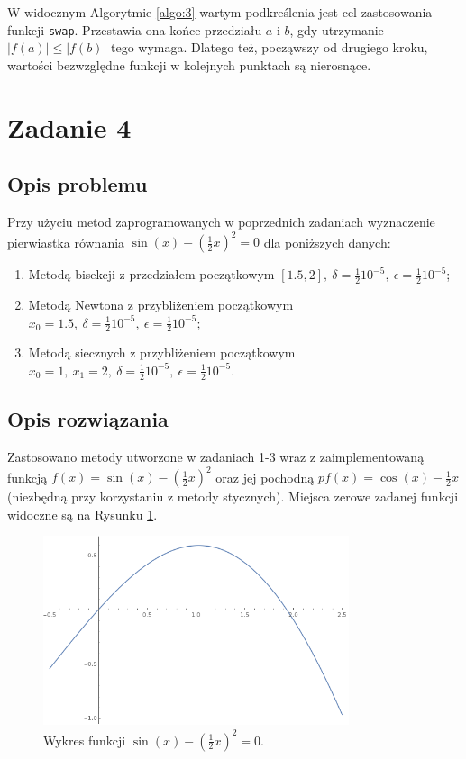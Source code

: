 \documentclass{classrep}
\begin{document}
		W widocznym Algorytmie \ref{algo:3} wartym podkreślenia jest cel zastosowania funkcji \texttt{swap}. Przestawia ona końce przedziału $a$ i $b$, gdy utrzymanie $|f(a)| \leq |f(b)|$ tego wymaga. Dlatego też, począwszy od drugiego kroku, wartości bezwzględne funkcji w kolejnych punktach są nierosnące.
\section{Zadanie 4}
	\subsection{Opis problemu}
		Przy użyciu metod zaprogramowanych w poprzednich zadaniach wyznaczenie pierwiastka równania $\sin(x)-(\frac{1}{2}x)^2=0$ dla poniższych danych:
		\begin{enumerate}[1.]
			\item Metodą bisekcji z przedziałem początkowym $[1.5,2],~\delta=\frac{1}{2}10^{-5},~\epsilon=\frac{1}{2}10^{-5}$;
			\item Metodą Newtona z przybliżeniem początkowym $x_0=1.5,~\delta=\frac{1}{2}10^{-5},~\epsilon=\frac{1}{2}10^{-5}$;
			\item Metodą siecznych z przybliżeniem początkowym $x_0=1,~x_1=2,~\delta=\frac{1}{2}10^{-5},~\epsilon=\frac{1}{2}10^{-5}$.
		\end{enumerate}
		
	\subsection{Opis rozwiązania}
		Zastosowano metody utworzone w zadaniach 1-3 wraz z zaimplementowaną funkcją $f(x)=\sin(x)-(\frac{1}{2}x)^2$ oraz jej pochodną $pf(x)=\cos(x)-\frac{1}{2}x$ (niezbędną przy korzystaniu z metody stycznych).  Miejsca zerowe zadanej funkcji widoczne są na Rysunku \ref{fig:3}.
		
		\begin{figure}[!htbp]
			\centering
			\includegraphics[width=0.8\textwidth]{zadania/plot41.png}
  			\caption{Wykres funkcji $\sin(x)-(\frac{1}{2}x)^2=0$.}
  			\label{fig:3}
		\end{figure}	
		
\end{document}
